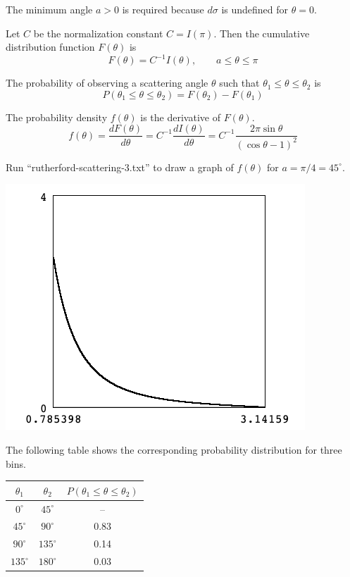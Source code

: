 \documentclass[12pt]{article}
\begin{document}
\noindent
The minimum angle $a>0$ is required because $d\sigma$ is undefined for $\theta=0$.

\bigskip
\noindent
Let $C$ be the normalization constant $C=I(\pi)$.
Then the cumulative distribution function $F(\theta)$ is
\begin{equation*}
F(\theta)=C^{-1}I(\theta),
\qquad a\le\theta\le\pi
\end{equation*}

\noindent
The probability of observing a scattering angle $\theta$ such that $\theta_1\le\theta\le\theta_2$ is
\begin{equation*}
P(\theta_1\le\theta\le\theta_2)=F(\theta_2)-F(\theta_1)
\end{equation*}

\noindent
The probability density $f(\theta)$ is the derivative of $F(\theta)$.
\begin{equation*}
f(\theta)=\frac{dF(\theta)}{d\theta}=C^{-1}\frac{dI(\theta)}{d\theta}
=C^{-1}\frac{2\pi\sin\theta}{(\cos\theta-1)^2}
\end{equation*}

\noindent
Run ``rutherford-scattering-3.txt'' to draw a graph of $f(\theta)$ for $a=\pi/4=45^\circ$.

\begin{center}
\includegraphics[scale=0.5]{rutherford-scattering-ss1.png}
\end{center}

\noindent
The following table shows the corresponding probability distribution for three bins.

\begin{center}
\begin{tabular}{|c|c|c|}
\hline
$\theta_1$ & $\theta_2$ & $P(\theta_1\le\theta\le\theta_2)$\\
\hline
$0^\circ$ & $45^\circ$ & -- \\
$45^\circ$ & $90^\circ$ & 0.83 \\
$90^\circ$ & $135^\circ$ & 0.14 \\
$135^\circ$ & $180^\circ$ & 0.03 \\
\hline
\end{tabular}
\end{center}
\end{document}
